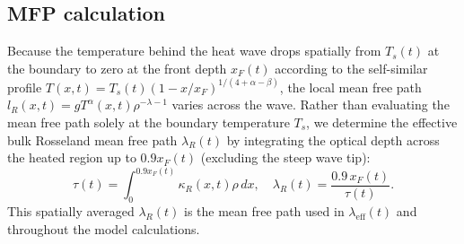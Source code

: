 \documentclass[11pt]{article}
\begin{document}
\subsection{MFP calculation}
{\color{red}Because the temperature behind the heat wave drops spatially from $T_s(t)$ at the boundary to zero at the front depth $x_F(t)$ according to the self-similar profile $T(x,t)=T_s(t)(1-x/x_F)^{1/(4+\alpha-\beta)}$, the local mean free path $l_R(x,t)=g T^\alpha(x,t)\rho^{-\lambda-1}$ varies across the wave. Rather than evaluating the mean free path solely at the boundary temperature $T_s$, we determine the effective bulk Rosseland mean free path $\lambda_R(t)$ by integrating the optical depth across the heated region up to $0.9x_F(t)$ (excluding the steep wave tip):
\begin{equation}
    \tau(t) = \int_0^{0.9 x_F(t)} \kappa_R(x,t)\rho\,dx, \quad \lambda_R(t) = \frac{0.9\,x_F(t)}{\tau(t)}.
\end{equation}
This spatially averaged $\lambda_R(t)$ is the mean free path used in $\lambda_{\mathrm{eff}}(t)$ and throughout the model calculations.}
\end{document}
